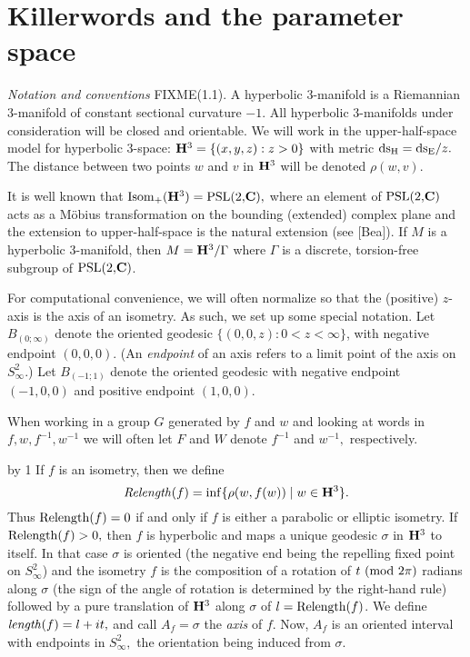 \def\Relength{{\rm Relength}}
\def\length{{\rm length}}
\def\Arccosh{{\rm Arccosh}}
\def\trace{{\rm trace}}
\def\distance{{\rm distance}}

\vglue-8pt
\section{Killerwords and the parameter space}
\vglue-4pt

{\it Notation and conventions} FIXME(1.1).
A hyperbolic $3$-manifold is a Riemannian $3$-manifold of constant sectional curvature $-1$.  All hyperbolic $3$-manifolds under
consideration will be closed and orientable. We will work in the upper-half-space model for
hyperbolic 3-space:  ${\bf H}^3 = \{(x,y,z): z > 0\}$ with 
metric ${\rm ds_H} = {\rm ds_E}/z.$ The distance between two points $w$ and $v$ in ${\bf H}^3$ will be denoted $\rho(w,v).$

It is well known that  
${\rm Isom}_+({\bf H}^3) = {\rm PSL(2,}{\bf C}),$  
where an element of
${\rm PSL(2,}{\bf C})$ acts as a M\"obius transformation on the bounding (extended) complex plane and the extension to upper-half-space is the natural extension
 (see [Bea]).  
If $M$ is a hyperbolic $3$-manifold, then $M={\bf H}^3/\Gamma$ where $\Gamma$ is a 
discrete, torsion-free subgroup of ${\rm PSL(2,}{\bf C})$.   

For computational convenience, we will often normalize so that the (positive) $z$-axis is the axis of an isometry.  As such, we set up some special notation.
Let $B_{(0;\infty)}$ denote the oriented geodesic $\{(0,0,z): 0< z < \infty \}$,
with negative endpoint $(0,0,0).$  (An {\it endpoint} of an axis refers to a limit point of the axis on $S^2_{\infty}$.) Let $B_{(-1;1)}$ denote the
oriented geodesic with negative endpoint $(-1,0,0)$ and positive endpoint $(1,0,0)$.

When working in a group $G$ generated by $f$ and $w$ and looking 
at words in $f,w, f^{-1}, w^{-1}$ we will often let $F$ and $W$ denote
$f^{-1}$ and $w^{-1},$ respectively.

\advance\theoremcount by 1
 If $f$ is an isometry, then we define
$${\it Relength}(f)=\inf\{\rho(w,f(w))\mid w\in {\bf H}^3\}.$$
Thus $\Relength(f)=0$ if and only if $f$ is either a parabolic or elliptic
isometry.  If $\Relength(f) > 0,$ then $f$
is hyperbolic and maps a unique geodesic $\sigma$ in ${\bf H}^3$ to itself. In that case
$\sigma$ is oriented (the negative end
being the repelling fixed point on $S^2_\infty$)  and the isometry $f$ is the
composition of a  rotation of $t \ ({\rm mod}\ 2\pi)$
radians along $\sigma$ (the sign of the angle of rotation is determined by the right-hand rule) followed by a pure translation of ${\bf H}^3$ along $\sigma$ of
$l = \Relength(f)$.  We define
${\it length}(f)=l+it,$ and call $A_f = \sigma$ the {\it axis} of $f.$  Now,  $A_f$ is an oriented interval with endpoints in $S^2_{\infty},$ the
orientation being induced from $\sigma.$


